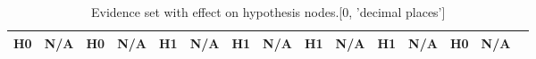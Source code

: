 \begin{table}
\begin{tabular}{c|cc|cc|cc|cc|cc|cc|cc}
\cellcolor{Bittersweet}H0&\cellcolor{Bittersweet}N/A&\cellcolor{Bittersweet}H0&\cellcolor{Bittersweet}N/A&\cellcolor{Bittersweet}H1&\cellcolor{Bittersweet}N/A&\cellcolor{Bittersweet}H1&\cellcolor{Bittersweet}N/A&\cellcolor{Bittersweet}H1&\cellcolor{Bittersweet}N/A&\cellcolor{Bittersweet}H1&\cellcolor{Bittersweet}N/A&\cellcolor{Bittersweet}H0&\cellcolor{Bittersweet}N/A\\\bottomrule\end{tabular}\caption{Evidence set with effect on hypothesis nodes.[0, 'decimal places']}\end{table}